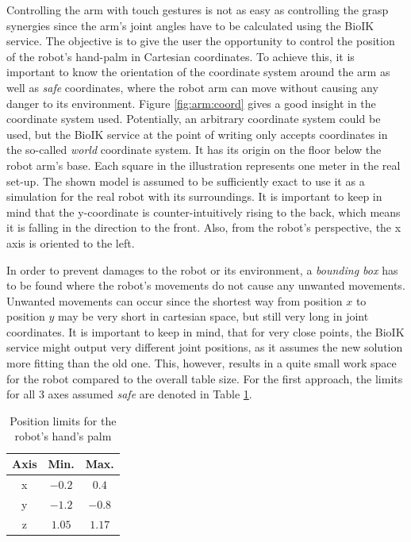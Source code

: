 Controlling the arm with touch gestures is not as easy as controlling the grasp synergies since the arm's joint angles have to be calculated using the BioIK service. The objective is to give the user the opportunity to control the position of the robot's hand-palm in Cartesian coordinates. To achieve this, it is important to know the orientation of the coordinate system around the arm as well as \textit{safe} coordinates, where the robot arm can move without causing any danger to its environment. Figure \ref{fig:arm:coord} gives a good insight in the coordinate system used. Potentially, an arbitrary coordinate system could be used, but the BioIK service at the point of writing only accepts coordinates in the so-called \textit{world} coordinate system. It has its origin on the floor below the robot arm's base. Each square in the illustration represents one meter in the real set-up. The shown model is assumed to be sufficiently exact to use it as a simulation for the real robot with its surroundings. It is important to keep in mind that the y-coordinate is counter-intuitively rising to the back, which means it is falling in the direction to the front. Also, from the robot's perspective, the x axis is oriented to the left.

In order to prevent damages to the robot or its environment, a \textit{bounding box} has to be found where the robot's movements do not cause any unwanted movements. Unwanted movements can occur since the shortest way from position $x$ to position $y$ may be very short in cartesian space, but still very long in joint coordinates. It is important to keep in mind, that for very close points, the BioIK service might output very different joint positions, as it assumes the new solution more fitting than the old one. This, however, results in a quite small work space for the robot compared to the overall table size. For the first approach, the limits for all 3 axes assumed \textit{safe} are denoted in Table \ref{tab:safeaxes}.

\begin{table}
	\caption{\label{tab:safeaxes}Position limits for the robot's hand's palm}
	\begin{tabular}{|c|c|c|}
		\hline
		\textbf{Axis} & \textbf{Min.} & \textbf{Max.} \\
		\hline
		x & $-0.2$ & $0.4$ \\
		\hline
		y & $-1.2$ & $-0.8$ \\
		\hline
		z & $1.05$ & $1.17$ \\
		\hline
	\end{tabular}
\end{table}

